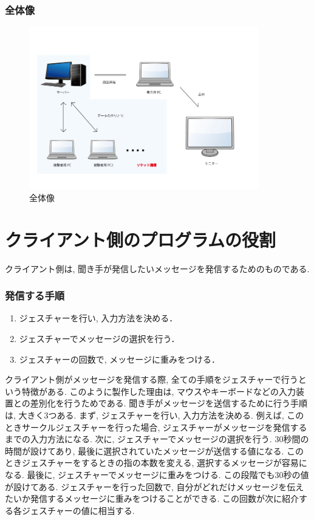 \documentclass{funthesis}
\begin{document}
\subsubsection{全体像}
\begin{figure}[H]
 \begin{center}
  \includegraphics[width=100mm]{./img/zentai.png}
 \end{center}
 \caption{全体像}
 \label{zentai}
\end{figure}

\section{クライアント側のプログラムの役割}
クライアント側は, 聞き手が発信したいメッセージを発信するためのものである. 

\subsubsection{発信する手順}

\begin{enumerate}
 \item ジェスチャーを行い, 入力方法を決める．
 \item ジェスチャーでメッセージの選択を行う．
 \item ジェスチャーの回数で, メッセージに重みをつける．
\end{enumerate}

クライアント側がメッセージを発信する際, 全ての手順をジェスチャーで行うという特徴がある. このように製作した理由は, マウスやキーボードなどの入力装置との差別化を行うためである. 聞き手がメッセージを送信するために行う手順は, 大きく3つある. 
まず, ジェスチャーを行い, 入力方法を決める. 例えば, このときサークルジェスチャーを行った場合, ジェスチャーがメッセージを発信するまでの入力方法になる. 
次に, ジェスチャーでメッセージの選択を行う. 30秒間の時間が設けてあり, 最後に選択されていたメッセージが送信する値になる. このときジェスチャーをするときの指の本数を変える, 選択するメッセージが容易になる. 
最後に, ジェスチャーでメッセージに重みをつける. この段階でも30秒の値が設けてある. ジェスチャーを行った回数で, 自分がどれだけメッセージを伝えたいか発信するメッセージに重みをつけることができる. この回数が次に紹介する各ジェスチャーの値に相当する. 
\end{document}
